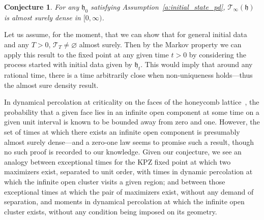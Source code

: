 \documentclass[oneside,final,11pt]{amsart}
\newtheorem{conjec}[thm]{Conjecture}
\theoremstyle{definition}
\newcounter{assum}
\newcommand{\fh}{\mathfrak{h}}
\newcommand{\CT}{\mathcal{T}}
\newcommand{\1}[1]{\mathbf{1}_{#1}}
\newcommand{\ah}[1]{\marginnote{\tiny{\color{green!65!black}[AH: #1]}}}
\let\emptyset\varnothing
\numberwithin{equation}{section}
\begin{document}
\begin{conjec}\label{conj:density}
For any $\fh_0$ satisfying Assumption~\ref{a:initial_state_pd}, $\CT_\infty(\fh)$ is almost surely dense in $[0, \infty)$.
\end{conjec}
Let us assume, for the moment, that we can show that for general initial data and any $T>0$,  $\CT_T\neq \emptyset$ almost surely. Then by the Markov property we can apply this result to the fixed point at any given time $t>0$ by considering the process started with initial data given by $\fh_t$. This would imply that around any rational time, there is a time arbitrarily close when non-uniqueness holds---thus the almost sure density result. %

In dynamical percolation at criticality on the faces of the honeycomb lattice~\cite{SS2010,GPS2010}, the probability that a given face lies in an infinite open component at some time on a given unit interval is known to be bounded away from zero and one. However, the set of times at which there exists an infinite open component is presumably almost surely dense---and a zero-one law seems to promise such a result, though no such proof is recorded to our knowledge. Given our conjecture, we see an analogy between exceptional times for the KPZ fixed point at which two maximizers exist, separated to unit order, with times in dynamic percolation at which the infinite open cluster visits a given region; and between those exceptional times at which the pair of maximizers exist, without any demand of separation, and moments in dynamical percolation at which the infinite open cluster exists, without any condition being imposed on its geometry.
\end{document}
